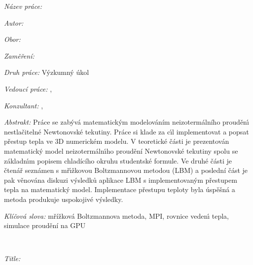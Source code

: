\begin{onehalfspace}
\noindent \emph{Název práce:}

\noindent \textbf{\nazevcz}
\end{onehalfspace}

\bigskip{}

\noindent \emph{Autor:} \autor

\bigskip{}

\noindent \emph{Obor:} \obor\bigskip{}

\noindent \emph{Zaměření:} \zamereni

\bigskip{}

\noindent \emph{Druh práce:} V\'{y}zkumn\'{y} \'{u}kol

\bigskip{}

\noindent \emph{Vedoucí práce:} \vedouci, \pracovisteVed

\bigskip{}

\noindent \emph{Konzultant:} \konzultant, \pracovisteVed

\bigskip{}

\noindent \emph{Abstrakt:} Pr\'{a}ce se zab\'{y}v\'{a} matematick\'{y}m modelov\'{a}n\'{i}m neizoterm\'{a}ln\'{i}ho proud\v{e}n\'{\i} nestla\v{c}iteln\'{e} Newtonovsk\'{e} tekutiny. Pr\'{a}ce si klade za c\'{\i}l implementovat a popsat p\v{r}estup tepla ve 3D numerick\'{e}m modelu. V teoretick\'{e} \v{c}\'{a}sti je prezentov\'{a}n matematick\'{y} model neizoterm\'{a}ln\'{\i}ho proud\v{e}n\'{i} Newtonovsk\'{e} tekutiny spolu se z\'{a}kladn\'{\i}m popisem chlad\'{i}c\'{i}ho okruhu studentsk\'{e} formule. Ve druh\'{e} \v{c}\'{a}sti je \v{c}ten\'{a}\v{r} sezn\'{a}men s m\v{r}\'{\i}\v{z}kovou Boltzmannovou metodou (LBM) a posledn\'{i} \v{c}\'{a}st je pak v\v{e}nov\'{a}na diskuzi v\'{y}sledk\r{u} aplikace LBM s implementovan\'{y}m p\v{r}estupem tepla na matematick\'{y} model. Implementace p\v{r}estupu teploty byla \'{u}sp\v{e}\v{s}n\'{a} a metoda produkuje uspokojiv\'{e} v\'{y}sledky.




\bigskip{}

\noindent \emph{Klíčová slova:} mřížková Boltzmannova metoda, MPI, rovnice veden\'{\i} tepla, simulace proudění na GPU

\vfill{}
~

%
\begin{onehalfspace}
\noindent \emph{Title:}

\noindent \textbf{\nazeven}
\end{onehalfspace}

